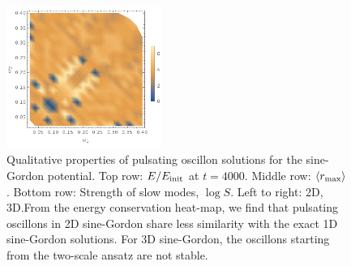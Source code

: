 \documentclass[11pt]{book}
\begin{document}
\begin{figure}[p]
  \includegraphics[width=0.45\textwidth]{plot/slow-mode-logscale-sine-3d.png}
  \caption{Qualitative properties of pulsating oscillon solutions for the sine-Gordon potential. Top row: $E/E_{\rm init}$ at $t=4000$.
    Middle row: $\langle r_{\rm max}\rangle$.
    Bottom row: Strength of slow modes, $\log{S}$.\quad
    Left to right: 2D, 3D.\qquad From the energy conservation heat-map, we find that pulsating oscillons in 2D sine-Gordon share less similarity with the exact 1D sine-Gordon solutions. For 3D sine-Gordon, the oscillons starting from the two-scale ansatz are not stable.}\label{sine2d3d}
\end{figure}
\restoregeometry
\end{document}
